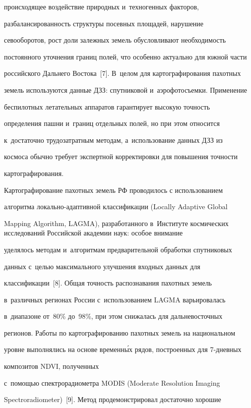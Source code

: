 происходящее воздействие природных и~техногенных факторов, 

разбалансированность структуры посевных площадей, нарушение 

севооборотов, рост доли залежных земель обуслов\-ли\-ва\-ют необходимость 

постоянного уточнения границ полей, что особенно актуально для южной части 

российского Дальнего Востока~[7]. В~целом для картографирования пахотных 

земель используются данные ДЗЗ: спутниковой и~аэрофотосъемки. Применение 

беспилотных летательных аппаратов гарантирует высокую точ\-ность 

определения пашни и~границ отдельных полей, но при этом относится 

к~достаточно трудозатратным методам, а~использование данных ДЗЗ из 

космоса обычно требует экспертной корректировки для повышения точ\-ности 

картографирования.

  

  Картографирование пахотных земель РФ проводилось с использованием 

алгоритма ло\-каль\-но-адап\-тив\-ной классификации (Locally Adaptive Global 

Mapping Algorithm, LAGMA), разработанного в~Институте космических исследований Российской академии наук: особое внимание 

уделялось методам и~алгоритмам предварительной обработки спутниковых 

данных с~целью максимального улучшения входных данных для 

классификации~[8]. Общая точ\-ность распознавания пахотных земель 

в~различных регионах России с~использованием LAGMA варьировалась 

в~диапазоне от~80\% до~98\%, при этом снижалась для дальневосточных 

регионов. Работы по картографированию пахотных земель на национальном 

уровне выполнялись на основе временн\'{ы}х рядов, построенных для 7-днев\-ных 

композитов NDVI, полученных 

с~помощью спектрорадиометра MODIS (Moderate Resolution Imaging 

Spectroradiometer)~[9]. Метод продемонстрировал достаточно хорошие 

